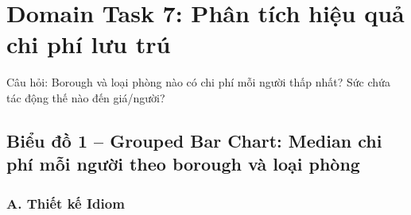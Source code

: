 \section{Domain Task 7: Phân tích hiệu quả chi phí lưu trú}

Câu hỏi: Borough và loại phòng nào có chi phí mỗi người thấp nhất? Sức
chứa tác động thế nào đến giá/người?

\subsection{Biểu đồ 1 -- Grouped Bar Chart: Median chi phí mỗi người theo borough và loại phòng}

\subsubsection*{A. Thiết kế Idiom}

